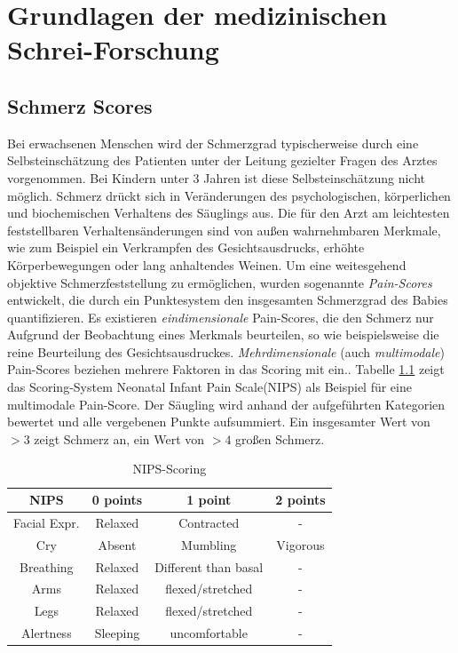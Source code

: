 \chapter{Grundlagen der medizinischen Schrei-Forschung}

\section{Schmerz Scores}
\label{sec:painScores}
Bei erwachsenen Menschen wird der Schmerzgrad typischerweise durch eine Selbsteinschätzung des Patienten unter der Leitung gezielter Fragen des Arztes vorgenommen. Bei Kindern unter 3 Jahren ist diese Selbsteinschätzung nicht möglich. Schmerz drückt sich in Veränderungen des psychologischen, körperlichen und biochemischen Verhaltens des Säuglings aus. Die für den Arzt am leichtesten feststellbaren Verhaltensänderungen sind von außen wahrnehmbaren Merkmale, wie zum Beispiel ein Verkrampfen des Gesichtsausdrucks, erhöhte Körperbewegungen oder lang anhaltendes Weinen. Um eine weitesgehend objektive Schmerzfeststellung zu ermöglichen, wurden sogenannte \emph{Pain-Scores} entwickelt, die durch ein Punktesystem den insgesamten Schmerzgrad des Babies quantifizieren.\cite{PainAssessment01} Es existieren \emph{eindimensionale} Pain-Scores, die den Schmerz nur Aufgrund der Beobachtung eines Merkmals beurteilen, so wie beispielsweise die reine Beurteilung des Gesichtsausdruckes. \emph{Mehrdimensionale} (auch \emph{ multimodale}) Pain-Scores beziehen mehrere Faktoren in das Scoring mit ein.\cite{PainAssessment02}. Tabelle \ref{tab:nips} zeigt das Scoring-System \glqq Neonatal Infant Pain Scale\grqq{}(NIPS) als Beispiel für eine multimodale Pain-Score. Der Säugling wird anhand der aufgeführten Kategorien bewertet und alle vergebenen Punkte aufsummiert. Ein insgesamter Wert von $>3$ zeigt Schmerz an, ein Wert von $>4$ großen Schmerz.\cite{nips}

\begin{table}[h]
	\footnotesize
	\centering
	\caption{NIPS-Scoring}
	\label{tab:nips}
	\begin{tabular}{@{}cccc@{}}
		\toprule
		\textbf{NIPS}     & \textbf{0 points} & \textbf{1 point}     & \textbf{2 points} \\ \midrule
		Facial Expr. & Relaxed           & Contracted           & -                 \\
		Cry               & Absent            & Mumbling             & Vigorous          \\
		Breathing         & Relaxed           & Different than basal & -                 \\
		Arms              & Relaxed           & flexed/stretched     & -                 \\
		Legs              & Relaxed           & flexed/stretched     & -                 \\
		Alertness         & Sleeping          & uncomfortable        & -                 \\ \bottomrule
	\end{tabular}
\end{table}


